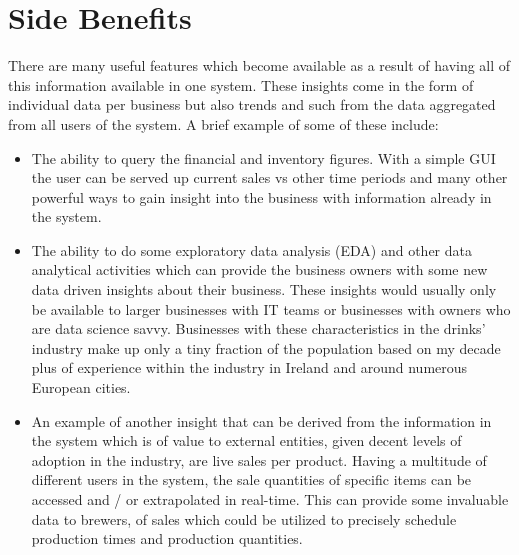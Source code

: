 \section{Side Benefits}
\label{subsec:side_benefits}
There are many useful features which become available as a result of having all of this information available in one system. These insights come in the form of individual data per
business but also trends and such from the data aggregated from all users of the system. A brief example of some of these include:
\begin{itemize}
	\item The ability to query the financial and inventory figures. With a simple GUI the user can be served up current sales vs other time periods and many other powerful ways to gain insight into
	      the business with information already in the system.
	\item The ability to do some exploratory data analysis (EDA) and other data analytical activities which can provide the business owners with some new data driven insights about their business.
	      These insights would usually only be available to larger businesses with IT teams or businesses with owners who are data science savvy. Businesses with these characteristics in the
	      drinks' industry make up only a tiny fraction of the population based on my decade plus of experience within the industry in Ireland and around numerous European cities.
	\item An example of another insight that can be derived from the information in the system which is of value to external entities, given decent levels of adoption in the industry,
	      are live sales per product.
	      Having a multitude of different users in the system, the sale quantities of specific items can be accessed and / or extrapolated in real-time. This can provide some invaluable
	      data to brewers, of sales which could be utilized to precisely schedule production times and production quantities.
\end{itemize}

